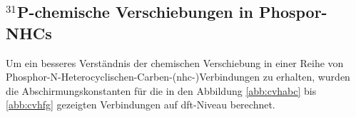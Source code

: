 %
%
%
\FloatBarrier

\subsection{\texorpdfstring{$^{31}$P}{31P}-chemische Verschiebungen in Phospor-NHCs}
Um ein besseres Verständnis der chemischen Verschiebung in einer Reihe von Phosphor-N-Heterocyclischen-Carben-(\acs{nhc}-)Verbindungen \supercite{lemp2017nhc} zu erhalten, wurden die Abschirmungskonstanten für die in den Abbildung \ref{abb:cvhabc} bis \ref{abb:cvhfg} gezeigten Verbindungen auf \ac{dft}-Niveau berechnet. 

